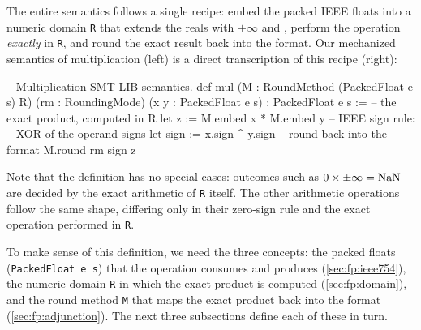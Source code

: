 The entire semantics follows a single recipe:
embed the packed IEEE floats into a numeric domain \texttt{R} that extends the reals with $\pm\infty$ and \nan{},
perform the operation \emph{exactly} in \texttt{R}, and round the exact result back into the format.
Our mechanized semantics of multiplication (left) is a direct transcription of this recipe (right):

\medskip
\noindent
\begin{minipage}[c]{0.5\linewidth}
\begin{lean4}[fontsize=\footnotesize]
--  Multiplication SMT-LIB semantics.
def mul 
    (M : RoundMethod (PackedFloat e s) R)
    (rm : RoundingMode)
    (x y : PackedFloat e s) : 
      PackedFloat e s :=
  -- the exact product, computed in R
  let z    := M.embed x * M.embed y
  -- IEEE sign rule: 
  --  XOR of the operand signs
  let sign := x.sign ^ y.sign
  -- round back into the format
  M.round rm sign z
\end{lean4}
\end{minipage}\hfill
\begin{minipage}[c]{0.49\linewidth}
\centering
{}
\end{minipage}
\medskip

\noindent
Note that the definition has no special cases:
outcomes such as $0 \times \pm\infty = \mathrm{NaN}$ are decided by the exact arithmetic of \texttt{R} itself.
The other arithmetic operations follow the same shape,
differing only in their zero-sign rule and the exact operation performed in \texttt{R}.

To make sense of this definition, we need the three concepts:
the packed floats (\texttt{PackedFloat e s}) that the operation consumes and produces (\cref{sec:fp:ieee754}),
the numeric domain \texttt{R} in which the exact product is computed (\cref{sec:fp:domain}),
and the round method \texttt{M} that maps the exact product back into the format (\cref{sec:fp:adjunction}).
The next three subsections define each of these in turn.

